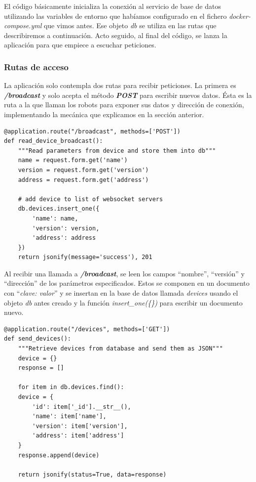 El código básicamente inicializa la conexión al servicio de base de datos utilizando las variables de entorno que habíamos configurado en el fichero \textit{docker-compose.yml} que vimos antes. Ese objeto \emph{db} se utiliza en las rutas que describiremos a continuación. Acto seguido, al final del código, se lanza la aplicación para que empiece a escuchar peticiones.\\

\subsubsection{Rutas de acceso}

La aplicación solo contempla dos rutas para recibir peticiones. La primera es \textbf{\textit{/broadcast}} y solo acepta el método \textbf{\textit{POST}} para escribir nuevos datos. Ésta es la ruta a la que llaman los robots para exponer sus datos y dirección de conexión, implementando la mecánica que explicamos en la sección anterior.\\

\begin{lstlisting}
@application.route("/broadcast", methods=['POST'])
def read_device_broadcast():
	"""Read parameters from device and store them into db"""
	name = request.form.get('name')
	version = request.form.get('version')
	address = request.form.get('address')
	
	# add device to list of websocket servers
	db.devices.insert_one({
		'name': name,
		'version': version,
		'address': address
	})
	return jsonify(message='success'), 201
\end{lstlisting}

Al recibir una llamada a \textbf{\textit{/broadcast}}, se leen los campos ``nombre'', ``versión'' y ``dirección'' de los parámetros especificados. Estos se componen en un documento con ``\textit{clave: valor}'' y se insertan en la base de datos llamada \emph{devices} usando el objeto \textit{db} antes creado y la función \emph{insert\_one(\{\})} para escribir un documento nuevo.\\


\begin{lstlisting}
@application.route("/devices", methods=['GET'])
def send_devices():
	"""Retrieve devices from database and send them as JSON"""
	device = {}
	response = []
	
	for item in db.devices.find():
	device = {
		'id': item['_id'].__str__(),
		'name': item['name'],
		'version': item['version'],
		'address': item['address']
	}
	response.append(device)
	
	return jsonify(status=True, data=response)
\end{lstlisting}

